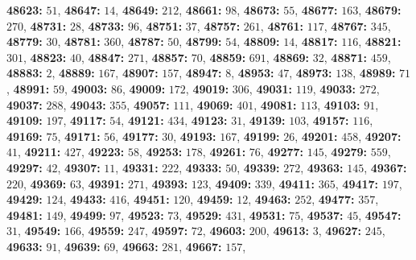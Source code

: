 \textsf{\bfseries 48623:} $51$, \textsf{\bfseries 48647:} $14$, \textsf{\bfseries 48649:} $212$, \textsf{\bfseries 48661:} $98$, \textsf{\bfseries 48673:} $55$, \textsf{\bfseries 48677:} $163$, \textsf{\bfseries 48679:} $270$, \textsf{\bfseries 48731:} $28$, \textsf{\bfseries 48733:} $96$, \textsf{\bfseries 48751:} $37$, \textsf{\bfseries 48757:} $261$, \textsf{\bfseries 48761:} $117$, \textsf{\bfseries 48767:} $345$, \textsf{\bfseries 48779:} $30$, \textsf{\bfseries 48781:} $360$, \textsf{\bfseries 48787:} $50$, \textsf{\bfseries 48799:} $54$, \textsf{\bfseries 48809:} $14$, \textsf{\bfseries 48817:} $116$, \textsf{\bfseries 48821:} $301$, \textsf{\bfseries 48823:} $40$, \textsf{\bfseries 48847:} $271$, \textsf{\bfseries 48857:} $70$, \textsf{\bfseries 48859:} $691$, \textsf{\bfseries 48869:} $32$, \textsf{\bfseries 48871:} $459$, \textsf{\bfseries 48883:} $2$, \textsf{\bfseries 48889:} $167$, \textsf{\bfseries 48907:} $157$, \textsf{\bfseries 48947:} $8$, \textsf{\bfseries 48953:} $47$, \textsf{\bfseries 48973:} $138$, \textsf{\bfseries 48989:} $71$, \textsf{\bfseries 48991:} $59$, \textsf{\bfseries 49003:} $86$, \textsf{\bfseries 49009:} $172$, \textsf{\bfseries 49019:} $306$, \textsf{\bfseries 49031:} $119$, \textsf{\bfseries 49033:} $272$, \textsf{\bfseries 49037:} $288$, \textsf{\bfseries 49043:} $355$, \textsf{\bfseries 49057:} $111$, \textsf{\bfseries 49069:} $401$, \textsf{\bfseries 49081:} $113$, \textsf{\bfseries 49103:} $91$, \textsf{\bfseries 49109:} $197$, \textsf{\bfseries 49117:} $54$, \textsf{\bfseries 49121:} $434$, \textsf{\bfseries 49123:} $31$, \textsf{\bfseries 49139:} $103$, \textsf{\bfseries 49157:} $116$, \textsf{\bfseries 49169:} $75$, \textsf{\bfseries 49171:} $56$, \textsf{\bfseries 49177:} $30$, \textsf{\bfseries 49193:} $167$, \textsf{\bfseries 49199:} $26$, \textsf{\bfseries 49201:} $458$, \textsf{\bfseries 49207:} $41$, \textsf{\bfseries 49211:} $427$, \textsf{\bfseries 49223:} $58$, \textsf{\bfseries 49253:} $178$, \textsf{\bfseries 49261:} $76$, \textsf{\bfseries 49277:} $145$, \textsf{\bfseries 49279:} $559$, \textsf{\bfseries 49297:} $42$, \textsf{\bfseries 49307:} $11$, \textsf{\bfseries 49331:} $222$, \textsf{\bfseries 49333:} $50$, \textsf{\bfseries 49339:} $272$, \textsf{\bfseries 49363:} $145$, \textsf{\bfseries 49367:} $220$, \textsf{\bfseries 49369:} $63$, \textsf{\bfseries 49391:} $271$, \textsf{\bfseries 49393:} $123$, \textsf{\bfseries 49409:} $339$, \textsf{\bfseries 49411:} $365$, \textsf{\bfseries 49417:} $197$, \textsf{\bfseries 49429:} $124$, \textsf{\bfseries 49433:} $416$, \textsf{\bfseries 49451:} $120$, \textsf{\bfseries 49459:} $12$, \textsf{\bfseries 49463:} $252$, \textsf{\bfseries 49477:} $357$, \textsf{\bfseries 49481:} $149$, \textsf{\bfseries 49499:} $97$, \textsf{\bfseries 49523:} $73$, \textsf{\bfseries 49529:} $431$, \textsf{\bfseries 49531:} $75$, \textsf{\bfseries 49537:} $45$, \textsf{\bfseries 49547:} $31$, \textsf{\bfseries 49549:} $166$, \textsf{\bfseries 49559:} $247$, \textsf{\bfseries 49597:} $72$, \textsf{\bfseries 49603:} $200$, \textsf{\bfseries 49613:} $3$, \textsf{\bfseries 49627:} $245$, \textsf{\bfseries 49633:} $91$, \textsf{\bfseries 49639:} $69$, \textsf{\bfseries 49663:} $281$, \textsf{\bfseries 49667:} $157$, 

